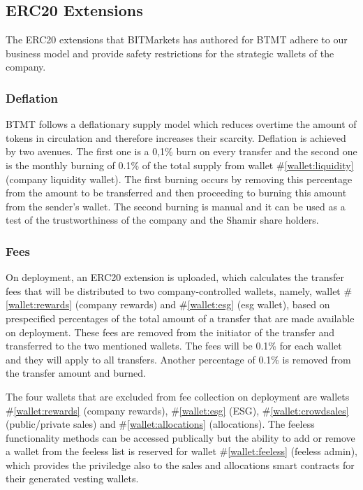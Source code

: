 \documentclass[a4paper,12pt]{article}
\begin{document}
\subsection{ERC20 Extensions}
The ERC20 extensions that BITMarkets has authored for BTMT adhere to our business model and provide safety restrictions for the strategic wallets of the company.

\subsubsection{Deflation}

BTMT follows a deflationary supply model which reduces overtime the amount of tokens in circulation and therefore increases their scarcity. Deflation is achieved by two avenues. The first one is a 0,1\% burn on every transfer and the second one is the monthly burning of 0.1\% of the total supply from wallet \#\ref{wallet:liquidity} (company liquidity wallet). The first burning occurs by removing this percentage from the amount to be transferred and then proceeding to burning this amount from the sender's wallet.
The second burning is manual and it can be used as a test of the trustworthiness of the company and the Shamir share holders.

\subsubsection{Fees}

On deployment,
an ERC20
extension
is uploaded, which calculates the transfer fees that will be distributed to two company-controlled wallets, namely, wallet \#\ref{wallet:rewards} (company rewards) and \#\ref{wallet:esg} (esg wallet), based on prespecified percentages of the total amount of a transfer that are made available on deployment. These fees are removed from the initiator of the transfer and transferred to the two mentioned wallets.
The fees will be 0.1\% for each wallet and they will apply to all transfers. Another percentage of 0.1\% is removed from the transfer
amount and burned.

The four wallets that are excluded from fee collection on deployment are wallets \#\ref{wallet:rewards} (company rewards), \#\ref{wallet:esg} (ESG), \#\ref{wallet:crowdsales} (public/private sales) and \#\ref{wallet:allocations} (allocations).
The feeless functionality methods can be accessed publically but the ability to add or remove a wallet from the feeless list is reserved for wallet \#\ref{wallet:feeless} (feeless admin), which provides the priviledge also to the sales and allocations smart contracts for their generated vesting wallets.
\end{document}

